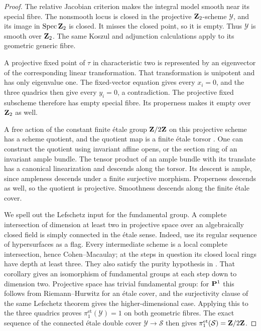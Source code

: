 \documentclass[11pt]{article}
\newcommand{\et}{\mathrm{et}}\newcommand{\crys}{\mathrm{crys}}
\DeclareMathOperator{\Spec}{Spec}\DeclareMathOperator{\Frac}{Frac}
\theoremstyle{definition}\newtheorem{definition}[theorem]{Definition}
\theoremstyle{remark}\newtheorem{remark}[theorem]{Remark}
\begin{document}
\begin{proof}
The relative Jacobian criterion makes the integral model smooth near its special fibre. The nonsmooth locus is closed in the projective $\mathbf Z_2$-scheme $\mathcal Y$, and its image in $\Spec\ZZ_2$ is closed. It misses the closed point, so it is empty. Thus $\mathcal Y$ is smooth over $\mathbf Z_2$. The same Koszul and adjunction calculations apply to its geometric generic fibre.

A projective fixed point of $\tau$ in characteristic two is represented by an eigenvector of the corresponding linear transformation. That transformation is unipotent and has only eigenvalue one. The fixed-vector equation gives every $x_i=0$, and the three quadrics then give every $y_i=0$, a contradiction. The projective fixed subscheme therefore has empty special fibre. Its properness makes it empty over $\mathbf Z_2$ as well.

A free action of the constant finite \'etale group $\mathbf Z/2\mathbf Z$ on this projective scheme has a scheme quotient, and the quotient map is a finite \'etale torsor \citep[Lemma~66.14.2, Tag~07S7]{Stacks}. One can construct the quotient using invariant affine opens, or the section ring of an invariant ample bundle. The tensor product of an ample bundle with its translate has a canonical linearization and descends along the torsor. Its descent is ample, since ampleness descends under a finite surjective morphism. Properness descends as well, so the quotient is projective. Smoothness descends along the finite \'etale cover.

We spell out the Lefschetz input for the fundamental group. A complete intersection of dimension at least two in projective space over an algebraically closed field is simply connected in the \'etale sense. Indeed, use its regular sequence of hypersurfaces as a flag. Every intermediate scheme is a local complete intersection, hence Cohen--Macaulay; at the steps in question its closed local rings have depth at least three. They also satisfy the purity hypothesis in \citet[Expos\'e~XII, Corollary~3.5, original p.~152; reedition p.~120]{SGA2}. That corollary gives an isomorphism of fundamental groups at each step down to dimension two. Projective space has trivial fundamental group: for $\mathbf P^1$ this follows from Riemann--Hurwitz for an \'etale cover, and the surjectivity clause of the same Lefschetz theorem gives the higher-dimensional case. Applying this to the three quadrics proves $\pi_1^{\et}(\mathcal Y)=1$ on both geometric fibres. The exact sequence of the connected \'etale double cover $\mathcal Y\to\mathcal S$ then gives $\pi_1^{\et}(\mathcal S)=\ZZ/2\ZZ$.
\end{proof}
\end{document}
